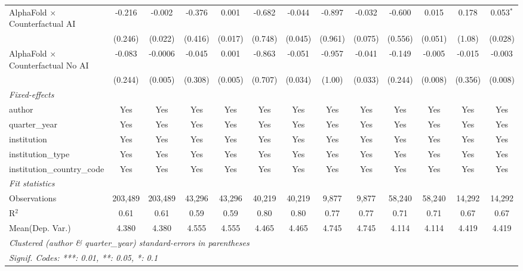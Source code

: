 \begin{tabular}{lcccccccccccc}
   AlphaFold $\times$ Counterfactual AI     & -0.216  & -0.002  & -0.376  & 0.001   & -0.682  & -0.044  & -0.897  & -0.032  & -0.600  & 0.015   & 0.178   & 0.053$^{*}$\\   
                                            & (0.246) & (0.022) & (0.416) & (0.017) & (0.748) & (0.045) & (0.961) & (0.075) & (0.556) & (0.051) & (1.08)  & (0.028)\\   
   AlphaFold $\times$ Counterfactual No AI  & -0.083  & -0.0006 & -0.045  & 0.001   & -0.863  & -0.051  & -0.957  & -0.041  & -0.149  & -0.005  & -0.015  & -0.003\\   
                                            & (0.244) & (0.005) & (0.308) & (0.005) & (0.707) & (0.034) & (1.00)  & (0.033) & (0.244) & (0.008) & (0.356) & (0.008)\\   
   \midrule
   \emph{Fixed-effects}\\
   author                                   & Yes     & Yes     & Yes     & Yes     & Yes     & Yes     & Yes     & Yes     & Yes     & Yes     & Yes     & Yes\\  
   quarter\_year                            & Yes     & Yes     & Yes     & Yes     & Yes     & Yes     & Yes     & Yes     & Yes     & Yes     & Yes     & Yes\\  
   institution                              & Yes     & Yes     & Yes     & Yes     & Yes     & Yes     & Yes     & Yes     & Yes     & Yes     & Yes     & Yes\\  
   institution\_type                        & Yes     & Yes     & Yes     & Yes     & Yes     & Yes     & Yes     & Yes     & Yes     & Yes     & Yes     & Yes\\  
   institution\_country\_code               & Yes     & Yes     & Yes     & Yes     & Yes     & Yes     & Yes     & Yes     & Yes     & Yes     & Yes     & Yes\\  
   \midrule
   \emph{Fit statistics}\\
   Observations                             & 203,489 & 203,489 & 43,296  & 43,296  & 40,219  & 40,219  & 9,877   & 9,877   & 58,240  & 58,240  & 14,292  & 14,292\\  
   R$^2$                                    & 0.61    & 0.61    & 0.59    & 0.59    & 0.80    & 0.80    & 0.77    & 0.77    & 0.71    & 0.71    & 0.67    & 0.67\\  
Mean(Dep. Var.) & 4.380 & 4.380 & 4.555 & 4.555 & 4.465 & 4.465 & 4.745 & 4.745 & 4.114 & 4.114 & 4.419 & 4.419 \\
   \midrule \midrule
   \multicolumn{13}{l}{\emph{Clustered (author \& quarter\_year) standard-errors in parentheses}}\\
   \multicolumn{13}{l}{\emph{Signif. Codes: ***: 0.01, **: 0.05, *: 0.1}}\\
\end{tabular}
\par\endgroup
